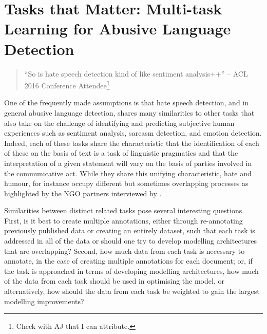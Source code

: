\ifpdf
    \graphicspath{{Chapter5/Figs/Raster/}{Chapter5/Figs/PDF/}{Chapter5/Figs/}}
\else
    \graphicspath{{Chapter5/Figs/Vector/}{Chapter5/Figs/}}
\fi

\chapter[Tasks that Matter: Multi-task Learning for Abusive Language Detection]{Tasks that Matter: Multi-task Learning for Abusive Language Detection\footnotemark{}}\label{chap:mtl}

\begin{quote}
  ``So is hate speech detection kind of like sentiment analysis++'' -- ACL 2016 Conference Attendee\footnote{Check with AJ that I can attribute.}
\end{quote}

One of the frequently made assumptions is that hate speech detection, and in general abusive language detection, shares many similarities to other tasks that also take on the challenge of identifying and predicting subjective human experiences such as sentiment analysis, sarcasm detection, and emotion detection.
Indeed, each of these tasks share the characteristic that the identification of each of these on the basis of text is a task of linguistic pragmatics and that the interpretation of a given statement will vary on the basis of parties involved in the communicative act.
While they share this unifying characteristic, hate and humour, for instance occupy different but sometimes overlapping processes as highlighted by the NGO partners interviewed by \citet{Rottger:2021}.

Similarities between distinct related tasks pose several interesting questions.
First, is it best to create multiple annotations, either through re-annotating previously published data or creating an entirely dataset, such that each task is addressed in all of the data or should one try to develop modelling architectures that are overlapping?
Second, how much data from each task is necessary to annotate, in the case of creating multiple annotations for each document; or, if the task is approached in terms of developing modelling architectures, how much of the data from each task should be used in optimising the model, or alternatively, how should the data from each task be weighted to gain the largest modelling improvements?

